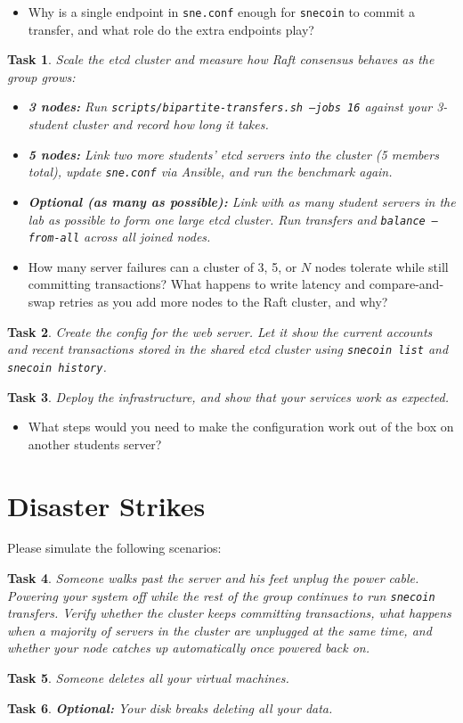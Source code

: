 \documentclass[11pt,a4paper]{exam}
\newcommand{\question}[1]{\begin{itemize}\item[$Q:$]{#1}\end{itemize}}
\newtheorem{task}{Task}
\begin{document}
\question{Why is a single endpoint in \texttt{sne.conf} enough for \texttt{snecoin} to commit a transfer, and what role do the extra endpoints play?}

\begin{task}
Scale the etcd cluster and measure how Raft consensus behaves as the group grows:

\begin{itemize}
    \item \textbf{3 nodes:} Run \texttt{scripts/bipartite-transfers.sh --jobs 16} against your 3-student cluster and record how long it takes.
    \item \textbf{5 nodes:} Link two more students' etcd servers into the cluster (5 members total), update \texttt{sne.conf} via Ansible, and run the benchmark again.
    \item \textbf{Optional (as many as possible):} Link with as many student servers in the lab as possible to form one large etcd cluster. Run transfers and \texttt{balance --from-all} across all joined nodes.
\end{itemize}
\end{task}

\question{How many server failures can a cluster of 3, 5, or $N$ nodes tolerate while still committing transactions? What happens to write latency and compare-and-swap retries as you add more nodes to the Raft cluster, and why?}

\begin{task}
Create the config for the web server. Let it show the current accounts and recent transactions stored in the shared etcd cluster using \texttt{snecoin list} and \texttt{snecoin history}.
\end{task}

\begin{task}
Deploy the infrastructure, and show that your services work as expected.
\end{task}

\question{What steps would you need to make the configuration work out of the box on another students server?}

\section*{Disaster Strikes}
Please simulate the following scenarios:

\begin{task}
    Someone walks past the server and his feet unplug the power cable. Powering your system off while the rest of the group continues to run \texttt{snecoin} transfers. Verify whether the cluster keeps committing transactions, what happens when a majority of servers in the cluster are unplugged at the same time, and whether your node catches up automatically once powered back on.
\end{task}

\begin{task}
    Someone deletes all your virtual machines.
\end{task}

\begin{task}
    \textup{\textbf{Optional:}} Your disk breaks deleting all your data.
\end{task}



\end{document}
